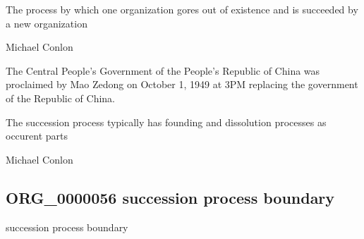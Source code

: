 \documentclass[letterpaper,10pt,english]{sphinxmanual}
\begin{document}
\begin{sphinxShadowBox}

\sphinxAtStartPar
The process by which one organization gores out of existence and is succeeded by a new organization
\end{sphinxShadowBox}

\begin{sphinxShadowBox}

\sphinxAtStartPar
Michael Conlon 
\end{sphinxShadowBox}

\begin{sphinxShadowBox}

\sphinxAtStartPar
The Central People’s Government of the People’s Republic of China was proclaimed by Mao Zedong on October 1, 1949 at 3PM replacing the government of the Republic of China.
\end{sphinxShadowBox}

\begin{sphinxShadowBox}

\sphinxAtStartPar
The succession process typically has founding and dissolution processes as occurent parts
\end{sphinxShadowBox}

\begin{sphinxShadowBox}

\sphinxAtStartPar
Michael Conlon 
\end{sphinxShadowBox}
\begin{quote}

\ignorespaces \end{quote}


\subsection{ORG\_0000056 \sphinxhyphen{} succession process boundary}
\label{\detokenize{doc-ORG_0000056:org-0000056-succession-process-boundary}}\label{\detokenize{doc-ORG_0000056:index-0}}\label{\detokenize{doc-ORG_0000056::doc}}
\begin{sphinxShadowBox}

\sphinxAtStartPar
succession process boundary
\end{sphinxShadowBox}
\end{document}
